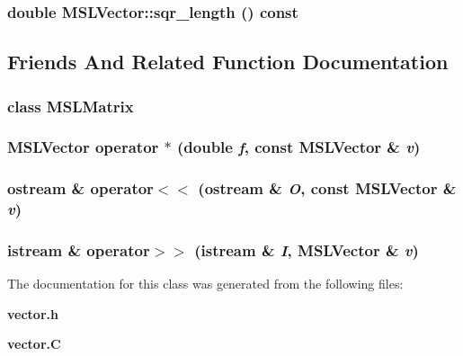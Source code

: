 \subsubsection{\setlength{\rightskip}{0pt plus 5cm}double MSLVector::sqr\_\-length () const}\label{classMSLVector_a13}




\subsection{Friends And Related Function Documentation}
\subsubsection{\setlength{\rightskip}{0pt plus 5cm}class MSLMatrix\hspace{0.3cm}{\tt  [friend]}}\label{classMSLVector_l0}


\subsubsection{\setlength{\rightskip}{0pt plus 5cm}MSLVector operator $\ast$ (double {\em f}, const MSLVector \& {\em v})\hspace{0.3cm}{\tt  [friend]}}\label{classMSLVector_l1}


\subsubsection{\setlength{\rightskip}{0pt plus 5cm}ostream \& operator$<$$<$ (ostream \& {\em O}, const MSLVector \& {\em v})\hspace{0.3cm}{\tt  [friend]}}\label{classMSLVector_l2}


\subsubsection{\setlength{\rightskip}{0pt plus 5cm}istream \& operator$>$$>$ (istream \& {\em I}, MSLVector \& {\em v})\hspace{0.3cm}{\tt  [friend]}}\label{classMSLVector_l3}




The documentation for this class was generated from the following files:\begin{CompactItemize}
\item 
{\bf vector.h}\item 
{\bf vector.C}\end{CompactItemize}
